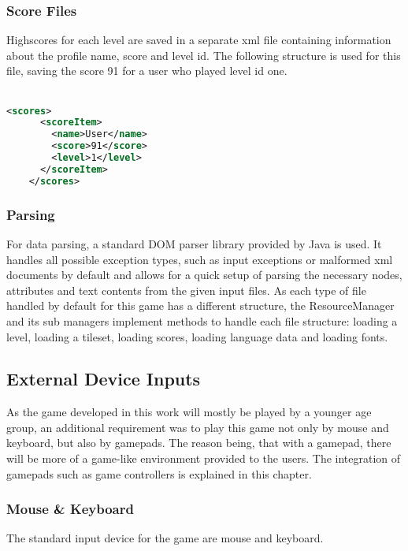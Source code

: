 \subsubsection{Score Files}\label{subsubsec:score-files}
Highscores for each level are saved in a separate xml file containing information about the profile name, score and level id.
The following structure is used for this file, saving the score 91 for a user who played level id one.
\\ \\
\begin{lstlisting}[language=XML,label={lst:score-xml}]
    <scores>
      <scoreItem>
        <name>User</name>
        <score>91</score>
        <level>1</level>
      </scoreItem>
    </scores>
\end{lstlisting}

\subsubsection{Parsing}\label{subsubsec:parsing}
For data parsing, a standard DOM parser library provided by Java is used.
It handles all possible exception types, such as input exceptions or malformed xml documents by default and allows for a quick setup of parsing
the necessary nodes, attributes and text contents from the given input files.
As each type of file handled by default for this game has a different structure, the ResourceManager and its sub managers implement methods to handle
each file structure: loading a level, loading a tileset, loading scores, loading language data and loading fonts.

\subsection{External Device Inputs}\label{subsec:external-device-inputs}
As the game developed in this work will mostly be played by a younger age group, an additional requirement was to play this game not only by mouse and keyboard,
but also by gamepads.
The reason being, that with a gamepad, there will be more of a game-like environment provided to the users.
The integration of gamepads such as game controllers is explained in this chapter.
\subsubsection{Mouse \& Keyboard}\label{subsubsec:mouse-&-keyboard}
The standard input device for the game are mouse and keyboard.
